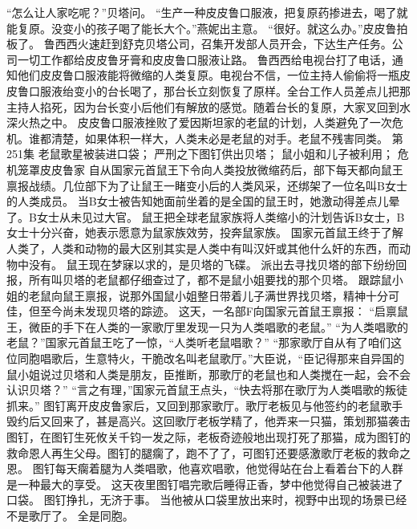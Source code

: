 \documentclass[a4paper,12pt,UTF8,twoside]{ctexbook}
\begin{document}
        “怎么让人家吃呢？”贝塔问。  
        “生产一种皮皮鲁口服液，把复原药掺进去，喝了就能复原。没变小的孩子喝了能长大个。”燕妮出主意。  
        “很好。就这么办。”皮皮鲁拍板了。  
        鲁西西火速赶到舒克贝塔公司，召集开发部人员开会，下达生产任务。公司一切工作都给皮皮鲁牙膏和皮皮鲁口服液让路。  
        鲁西西给电视台打了电话，通知他们皮皮鲁口服液能将微缩的人类复原。电视台不信，一位主持人偷偷将一瓶皮皮鲁口服液绐变小的台长喝了，那台长立刻恢复了原样。全台工作人员差点儿把那主持人掐死，因为台长变小后他们有解放的感觉。随着台长的复原，大家叉回到水深火热之中。  
        皮皮鲁口服液挫败了爱因斯坦家的老鼠的计划，人类避免了一次危机。谁都清楚，如果体积一样大，人类未必是老鼠的对手。老鼠不残害同类。          第251集  
        老鼠歌星被装进口袋；  
        严刑之下图钉供出贝塔；  
        鼠小姐和儿子被利用；  
        危机笼罩皮皮鲁家    
        自从国家元首鼠王下令向人类投放微缩药后，部下每天都向鼠王禀报战绩。几位部下为了让鼠王一睹变小后的人类风采，还绑架了一位名叫B女士的人类成员。  
        当B女士被告知她面前坐着的是全国的鼠王时，她激动得差点儿晕了。B女士从未见过大官。  
        鼠王把全球老鼠家族将人类缩小的汁划告诉B女士，B女士十分兴奋，她表示愿意为鼠家族效劳，投奔鼠家族。  
        国家元首鼠王终于了解人类了，人类和动物的最大区别其实是人类中有叫汉奸或其他什么奸的东西，而动物中没有。  
        鼠王现在梦寐以求的，是贝塔的飞碟。  
        派出去寻找贝塔的部下纷纷回报，所有叫贝塔的老鼠都仔细查过了，都不是鼠小姐要找的那个贝塔。  
        跟踪鼠小姐的老鼠向鼠王禀报，说那外国鼠小姐整日带着儿子满世界找贝塔，精神十分可佳，但至今尚未发现贝塔的踪迹。  
        这天，一名部F向国家元首鼠王禀报：  
        “启禀鼠王，微臣的手下在人类的一家歌厅里发现一只为人类唱歌的老鼠。”  
        “为人类唱歌的老鼠？”国家元首鼠王吃了一惊，“人类听老鼠唱歌？”  
        “那家歌厅自从有了咱们这位同胞唱歌后，生意特火，干脆改名叫老鼠歌厅。”大臣说，“臣记得那来自异国的鼠小姐说过贝塔和人类是朋友，臣推断，那歌厅的老鼠也和人类搅在一起，会不会认识贝塔？”  
        “言之有理，”国家元首鼠王点头，“快去将那在歌厅为人类唱歌的叛徒抓来。”  
        图钉离开皮皮鲁家后，又回到那家歌厅。歌厅老板见与他签约的老鼠歌手毁约后又回来了，甚是高兴。这回歌厅老板学精了，他弄来一只猫，策划那猫袭击图钉，在图钉生死攸关千钧一发之际，老板奇迹般地出现打死了那猫，成为图钉的救命恩人再生父母。图钉的腿瘸了，跑不了了，可图钉还要感激歌厅老板的救命之恩。  
        图钉每天瘸着腿为人类唱歌，他喜欢唱歌，他觉得站在台上看着台下的人群是一种最大的享受。  
        这天夜里图钉唱完歌后睡得正香，梦中他觉得自己被装进了口袋。  
        图钉挣扎，无济于事。  
        当他被从口袋里放出来时，视野中出现的场景已经不是歌厅了。  
        全是同胞。  
\end{document}
